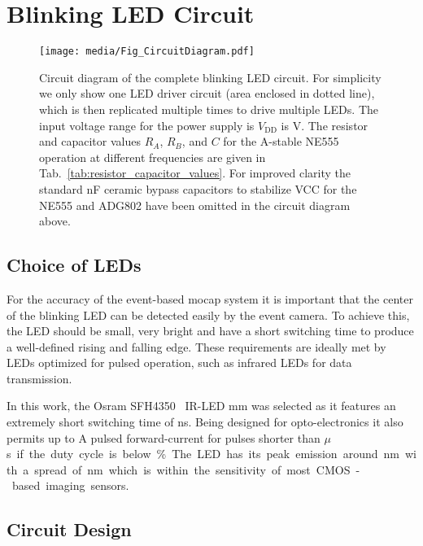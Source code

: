 \section{Blinking LED Circuit}
\label{sec:blinked_led_circuit}
%
\begin{figure*}
    \centering
    \texttt{[image: media/Fig\_CircuitDiagram.pdf]}
    \caption{Circuit diagram of the complete blinking LED circuit. For simplicity we only show one LED driver circuit (area enclosed in dotted line), which is then replicated multiple times to drive multiple LEDs. The input voltage range for the power supply is $V_\text{DD}$ is \unit[8-35]{V}. The resistor and capacitor values $R_A$, $R_B$, and $C$ for the A-stable NE555 operation at different frequencies are given in Tab.~\ref{tab:resistor_capacitor_values}. For improved clarity the standard \unit[100]{nF} ceramic bypass capacitors to stabilize VCC for the NE555 and ADG802 have been omitted in the circuit diagram above.}
    \label{fig:circuit_diagram}
\end{figure*}
%
\subsection{Choice of LEDs}
\label{subsec:choice_of_leds}
For the accuracy of the event-based mocap system it is important that the center of the blinking LED can be detected easily by the event camera. To achieve this, the LED should be small, very bright and have a short switching time to produce a well-defined rising and falling edge. These requirements are ideally met by LEDs optimized for pulsed operation, such as infrared LEDs for data transmission.

In this work, the Osram SFH4350~\cite{osram4350} IR-LED \unit[3]{mm} was selected as it features an extremely short switching time of \unit[12]{ns}. Being designed for opto-electronics it also permits up to \unit[1]{A} pulsed forward-current for pulses shorter than \unit[100]{$\mu$s} if the duty cycle is below \unit[2]{\%}. The LED has its peak emission around \unit[850]{nm} with a spread of \unit[50]{nm} which is within the sensitivity of most CMOS-based imaging sensors.

\subsection{Circuit Design}
\label{subsec:circuit_design}

